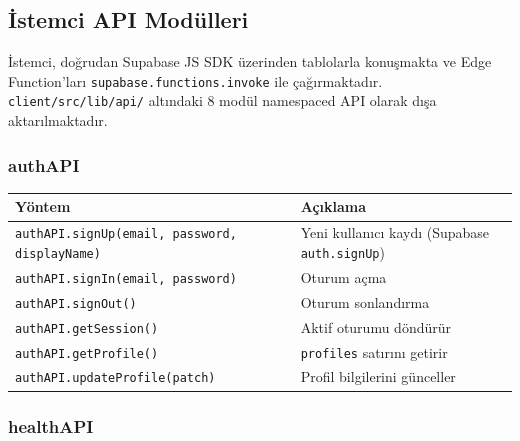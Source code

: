 \subsection{İstemci API Modülleri}

İstemci, doğrudan Supabase JS SDK üzerinden tablolarla konuşmakta ve Edge Function'ları \texttt{supabase.functions.invoke} ile çağırmaktadır. \texttt{client/src/lib/api/} altındaki 8 modül namespaced API olarak dışa aktarılmaktadır.

\subsubsection{authAPI}

\begin{table}[H]
\centering
\small
\begin{tabular}{|l|p{}|}
\hline
\textbf{Yöntem} & \textbf{Açıklama} \\
\hline
\texttt{authAPI.signUp(email, password, displayName)} & Yeni kullanıcı kaydı (Supabase \texttt{auth.signUp}) \\
\texttt{authAPI.signIn(email, password)} & Oturum açma \\
\texttt{authAPI.signOut()}                & Oturum sonlandırma \\
\texttt{authAPI.getSession()}             & Aktif oturumu döndürür \\
\texttt{authAPI.getProfile()}             & \texttt{profiles} satırını getirir \\
\texttt{authAPI.updateProfile(patch)}     & Profil bilgilerini günceller \\
\hline
\end{tabular}
\end{table}

\subsubsection{healthAPI}

